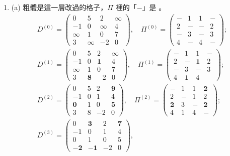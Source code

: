 \begin{enumerate}
\item (a) 粗體是這一層改過的格子，$\Pi$ 裡的「$-$」是 \NIL。
\begin{gather*}
D^{(0)} = \begin{pmatrix} 0 & 5 & 2 & \infty \\ -1 & 0 & \infty & 4 \\ \infty & 1 & 0 & 7 \\ 3 & \infty & -2 & 0 \end{pmatrix},\quad
\Pi^{(0)} = \begin{pmatrix} - & 1 & 1 & - \\ 2 & - & - & 2 \\ - & 3 & - & 3 \\ 4 & - & 4 & - \end{pmatrix}; \\
D^{(1)} = \begin{pmatrix} 0 & 5 & 2 & \infty \\ -1 & 0 & \mathbf{1} & 4 \\ \infty & 1 & 0 & 7 \\ 3 & \mathbf{8} & -2 & 0 \end{pmatrix},\quad
\Pi^{(1)} = \begin{pmatrix} - & 1 & 1 & - \\ 2 & - & \mathbf{1} & 2 \\ - & 3 & - & 3 \\ 4 & \mathbf{1} & 4 & - \end{pmatrix}; \\
D^{(2)} = \begin{pmatrix} 0 & 5 & 2 & \mathbf{9} \\ -1 & 0 & 1 & 4 \\ \mathbf{0} & 1 & 0 & \mathbf{5} \\ 3 & 8 & -2 & 0 \end{pmatrix},\quad
\Pi^{(2)} = \begin{pmatrix} - & 1 & 1 & \mathbf{2} \\ 2 & - & 1 & 2 \\ \mathbf{2} & 3 & - & \mathbf{2} \\ 4 & 1 & 4 & - \end{pmatrix}; \\
D^{(3)} = \begin{pmatrix} 0 & \mathbf{3} & 2 & \mathbf{7} \\ -1 & 0 & 1 & 4 \\ 0 & 1 & 0 & 5 \\ \mathbf{-2} & \mathbf{-1} & -2 & 0 \end{pmatrix},\quad

\end{gather*}
\end{enumerate}

